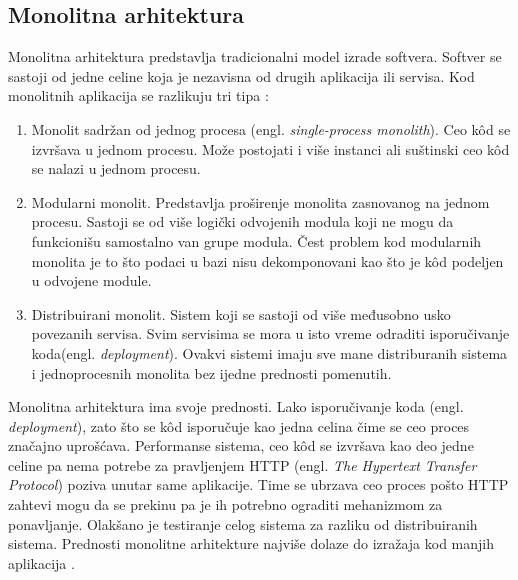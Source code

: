 \documentclass[12pt,oneside]{memoir}
\begin{document}
\subsection{Monolitna arhitektura}
Monolitna arhitektura predstavlja tradicionalni model izrade softvera. Softver se sastoji od jedne celine koja je nezavisna od drugih aplikacija ili servisa. Kod monolitnih aplikacija se razlikuju tri tipa \cite{bm}:
\begin{enumerate}
  \item Monolit sadržan od jednog procesa (engl. \emph{single-process monolith}). Ceo kôd se izvršava u jednom procesu. Može postojati i više instanci ali suštinski ceo kôd se nalazi u jednom procesu. 
  \item Modularni monolit. Predstavlja proširenje monolita zasnovanog na jednom procesu. Sastoji se od više logički odvojenih modula koji ne mogu da funkcionišu samostalno van grupe modula. Čest problem kod modularnih monolita je to što podaci u bazi nisu dekomponovani kao što je kôd podeljen u odvojene module.
  \item Distribuirani monolit. Sistem koji se sastoji od više međusobno usko povezanih servisa. Svim servisima se mora u isto vreme odraditi isporučivanje koda(engl. \emph{deployment}). Ovakvi sistemi imaju sve mane distriburanih sistema i jednoprocesnih monolita bez ijedne prednosti pomenutih.
\end{enumerate}

Monolitna arhitektura ima svoje prednosti. Lako isporučivanje koda (engl. \emph{deployment}), zato što se kôd isporučuje kao jedna celina čime se ceo proces značajno uprošćava. Performanse sistema, ceo kôd se izvršava kao deo jedne celine pa nema potrebe za pravljenjem HTTP (engl. \emph{The Hypertext Transfer Protocol}) poziva unutar same aplikacije. Time se ubrzava ceo proces pošto HTTP zahtevi mogu da se prekinu pa je ih potrebno ograditi mehanizmom za ponavljanje. Olakšano je testiranje celog sistema za razliku od distribuiranih sistema. Prednosti monolitne arhitekture najviše dolaze do izražaja kod manjih aplikacija \cite{bm}.
\end{document}

